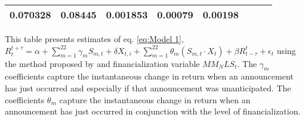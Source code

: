 \begin{sidewaystable}
{\begin{tabular}{@{}lllllllllllll@{}}
\multicolumn{2}{c}{ 0.070328 }                                                 & \multicolumn{2}{c}{ 0.08445 }                                                 & \multicolumn{2}{c}{ 0.001853 }                                                 & \multicolumn{2}{c}{ 0.00079 }                                                   & \multicolumn{2}{c}{ 0.00198 }                                                 \\ \bottomrule 
\end{tabular}
}
\begin{tablenotes}\item 
    \singlespacing
    \footnotesize
    This table presents estimates of eq. \ref{eq:Model 1}, $R_{t}^{t+\tau}=\alpha+\sum_{m=1}^{22} \gamma_m S_{m,t}+ \delta X_{t,i} + \sum_{m=1}^{22} \theta_m (S_{m,t} \cdot X_t)+\beta R_{t-\tau}^{t}+\epsilon_{t}$ using the method proposed by \citet{kurov2019price} and financialization variable $MM_NLS_t$. The $\gamma_m$ coefficients capture the instantaneous change in return when an announcement has just occurred and especially if that announcement was unanticipated. The coefficients $\theta_m$ capture the instantaneous change in return when an announcement has just occurred in conjunction with the level of financialization.
\end{tablenotes}
\end{sidewaystable}

